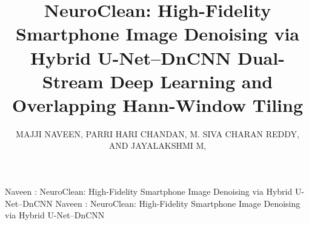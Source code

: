 \documentclass{ieeeaccess}
\begin{document}

\title{NeuroClean: High-Fidelity Smartphone Image Denoising via Hybrid U-Net--DnCNN Dual-Stream Deep Learning and Overlapping Hann-Window Tiling}

\author{\uppercase{Majji Naveen},
\uppercase{Parri Hari Chandan},
\uppercase{M. Siva Charan Reddy},
\uppercase{and Jayalakshmi M}, }

\address[1]{School of Computer Science and Engineering (SCOPE), Vellore Institute of Technology (VIT), Vellore, Tamil Nadu 632014, India}

\markboth
{Naveen \headeretal: NeuroClean: High-Fidelity Smartphone Image Denoising via Hybrid U-Net--DnCNN}
{Naveen \headeretal: NeuroClean: High-Fidelity Smartphone Image Denoising via Hybrid U-Net--DnCNN}

\end{document}
